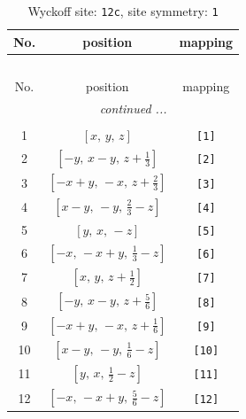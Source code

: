 \documentclass[fleqn,8pt]{jsarticle}
\begin{document}
\begin{longtable}{ccc}
\caption{Wyckoff site: {\tt 12c}, site symmetry: {\tt 1}}
 \\
 \hline \hline
No. & position & mapping \\ \hline \endfirsthead

\multicolumn{2}{l}{\tablename\ \thetable{}} \\
 \hline \hline
No. & position & mapping \\ \hline \endhead

 \hline \hline
\multicolumn{2}{r}{\footnotesize\it continued ...} \\ \endfoot

 \hline \hline
\multicolumn{2}{r}{} \\ \endlastfoot

1 & $\left[ x,\, y,\, z \right]$ & {\tt [1]} \\ \hline
2 & $\left[ - y,\, x - y,\, z + \frac{1}{3} \right]$ & {\tt [2]} \\ \hline
3 & $\left[ - x + y,\, - x,\, z + \frac{2}{3} \right]$ & {\tt [3]} \\ \hline
4 & $\left[ x - y,\, - y,\, \frac{2}{3} - z \right]$ & {\tt [4]} \\ \hline
5 & $\left[ y,\, x,\, - z \right]$ & {\tt [5]} \\ \hline
6 & $\left[ - x,\, - x + y,\, \frac{1}{3} - z \right]$ & {\tt [6]} \\ \hline
7 & $\left[ x,\, y,\, z + \frac{1}{2} \right]$ & {\tt [7]} \\ \hline
8 & $\left[ - y,\, x - y,\, z + \frac{5}{6} \right]$ & {\tt [8]} \\ \hline
9 & $\left[ - x + y,\, - x,\, z + \frac{1}{6} \right]$ & {\tt [9]} \\ \hline
10 & $\left[ x - y,\, - y,\, \frac{1}{6} - z \right]$ & {\tt [10]} \\ \hline
11 & $\left[ y,\, x,\, \frac{1}{2} - z \right]$ & {\tt [11]} \\ \hline
12 & $\left[ - x,\, - x + y,\, \frac{5}{6} - z \right]$ & {\tt [12]} \\
\end{longtable}
\end{document}
